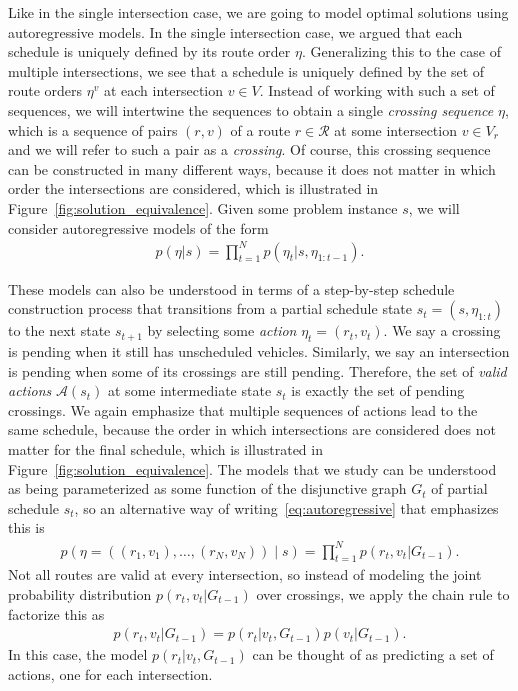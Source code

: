 \documentclass[a4paper]{article}
\theoremstyle{definition}
\theoremstyle{plain}
\begin{document}
Like in the single intersection case, we are going to model optimal solutions
using autoregressive models.
%
In the single intersection case, we argued that each schedule is uniquely
defined by its route order $\eta$. Generalizing this to the case of multiple
intersections, we see that a schedule is uniquely defined by the set of
route orders $\eta^{v}$ at each intersection $v \in V$. Instead of working with
such a set of sequences, we will intertwine the sequences to obtain a single
\textit{crossing sequence} $\eta$, which is a sequence of pairs $(r, v)$ of a
route $r \in \mathcal{R}$ at some intersection $v \in V_{r}$ and we will refer
to such a pair as a \textit{crossing}. Of course, this crossing sequence can be
constructed in many different ways, because it does not matter in which order
the intersections are considered, which is illustrated in Figure~\ref{fig:solution_equivalence}.
Given some problem instance $s$, we will consider autoregressive models of the form
\begin{align}
  \label{eq:autoregressive}
  p(\eta | s) =  \prod_{t=1}^{N} p(\eta_{t}| s, \eta_{1:t-1}) .
\end{align}

These models can also be understood in terms of a step-by-step schedule
construction process that transitions from a partial schedule state
$s_{t} = (s, \eta_{1:t})$ to the next state $s_{t+1}$ by selecting some
\textit{action} $\eta_{t} = (r_{t}, v_{t})$. We say a crossing is pending when
it still has unscheduled vehicles. Similarly, we say an intersection is pending
when some of its crossings are still pending. Therefore, the set of \textit{valid actions}
$\mathcal{A}(s_{t})$ at some intermediate state $s_{t}$ is exactly the set of
pending crossings.
%
We again emphasize that multiple sequences of actions lead to the same schedule,
because the order in which intersections are considered does not matter for the
final schedule, which is illustrated in Figure~\ref{fig:solution_equivalence}.
%
The models that we study can be understood as being parameterized as some
function of the disjunctive graph $G_{t}$ of partial schedule $s_{t}$, so an
alternative way of writing~\eqref{eq:autoregressive} that emphasizes this is
\begin{align}
  p(\eta = ((r_{1}, v_{1}), \dots, (r_{N}, v_{N})) \; | \; s) = \prod_{t=1}^{N} p(r_{t}, v_{t} | G_{t-1}) .
\end{align}
%
Not all routes are valid at every intersection, so instead of modeling the joint
probability distribution $p(r_{t}, v_{t} | G_{t-1})$ over crossings, we apply
the chain rule to factorize this as
\begin{align}
  p(r_{t}, v_{t} | G_{t-1}) = p(r_{t} | v_{t} , G_{t-1}) p (v_{t} | G_{t-1}) .
\end{align}
In this case, the model $p(r_{t} | v_{t}, G_{t-1})$ can be thought of as
predicting a set of actions, one for each intersection.
\end{document}
